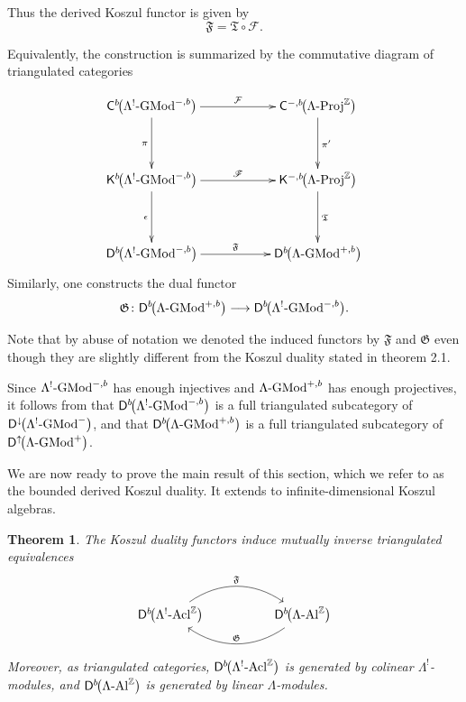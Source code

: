 \documentclass[11pt]{article}
\newtheorem{theorem}{Theorem}[section]
\theoremstyle{definition}
\theoremstyle{remark}
\begin{document}
Thus the derived Koszul functor is given by
\[
\mathfrak{F}
=
\mathfrak{T}\circ\mathscr{F}.
\]



Equivalently, the construction is summarized by the commutative diagram of triangulated categories

\[
\xymatrix@C=5.5em@R=4em{
\mathsf{C}^{b}\!\bigl(\Lambda^{!}\textup{-}\mathrm{GMod}^{-,b}\bigr)
\ar[r]^-{\mathcal{F}} \ar[d]_{\scriptstyle \pi} &
\mathsf{C}^{-,b}\!\bigl(\Lambda\textup{-}\mathrm{Proj}^{\mathbb{Z}}\bigr)
\ar[d]^{\scriptstyle \pi'} \\
\mathsf{K}^{b}\!\bigl(\Lambda^{!}\textup{-}\mathrm{GMod}^{-,b}\bigr)
\ar[r]^-{\mathscr{F}} \ar[d]_{\scriptstyle \epsilon} &
\mathsf{K}^{-,b}\!\bigl(\Lambda\textup{-}\mathrm{Proj}^{\mathbb{Z}}\bigr)
\ar[d]^{\scriptstyle \mathfrak{T}} \\
\mathsf{D}^{b}\!\bigl(\Lambda^{!}\textup{-}\mathrm{GMod}^{-,b}\bigr)
\ar[r]^-{\mathfrak{F}} &
\mathsf{D}^{b}\!\bigl(\Lambda\textup{-}\mathrm{GMod}^{+,b}\bigr)
}
\]
Similarly, one constructs the dual  functor
\[
\mathfrak{G}\colon
\mathsf{D}^{b}\!\bigl(\Lambda\textup{-}\mathrm{GMod}^{+,b}\bigr)
\longrightarrow
\mathsf{D}^{b}\!\bigl(\Lambda^{!}\textup{-}\mathrm{GMod}^{-,b}\bigr).
\]

Note that by abuse of notation we denoted the induced functors by $\mathfrak{F}$ and $\mathfrak{G}$ even though they are slightly different from the Koszul duality stated in theorem 2.1.

\medskip 

Since \(\Lambda^{!}\textup{-}\mathrm{GMod}^{-,b}\) has enough injectives and
\(\Lambda\textup{-}\mathrm{GMod}^{+,b}\) has enough projectives, it follows
from \cite[Proposition~2.14]{8} that
\(\mathsf{D}^{b}\!\bigl(\Lambda^{!}\textup{-}\mathrm{GMod}^{-,b}\bigr)\)
 is a full triangulated subcategory of
\(\mathsf{D}^{\downarrow}\!\bigl(\Lambda^{!}\textup{-}\mathrm{GMod}^{-}\bigr)\),
and that
\(\mathsf{D}^{b}\!\bigl(\Lambda\textup{-}\mathrm{GMod}^{+,b}\bigr)\)
is a full triangulated subcategory of
\(\mathsf{D}^{\uparrow}\!\bigl(\Lambda\textup{-}\mathrm{GMod}^{+}\bigr)\).

\medskip 
We are now ready to prove the main result of this section, which we refer to
as the bounded derived Koszul duality. It extends
\cite[Theorem~3.8]{8} to infinite-dimensional Koszul algebras.

\begin{theorem}
The Koszul duality functors induce mutually inverse triangulated equivalences
\[
\begin{tikzcd}[column sep=huge]
\mathsf{D}^{b}\!\bigl(\Lambda^{!}\textup{-}\mathrm{Acl}^{\mathbb{Z}}\bigr)
\arrow[r, bend left=35, "\mathfrak{F}"]
&
\mathsf{D}^{b}\!\bigl(\Lambda\textup{-}\mathrm{Al}^{\mathbb{Z}}\bigr)
\arrow[l, bend left=35, "\mathfrak{G}"']
\end{tikzcd}
\]
Moreover, as triangulated categories,
\(\mathsf{D}^{b}\!\bigl(\Lambda^{!}\textup{-}\mathrm{Acl}^{\mathbb{Z}}\bigr)\)
is generated by colinear \(\Lambda^{!}\)-modules, and
\(\mathsf{D}^{b}\!\bigl(\Lambda\textup{-}\mathrm{Al}^{\mathbb{Z}}\bigr)\)
is generated by linear \(\Lambda\)-modules.
\end{theorem}
\end{document}

